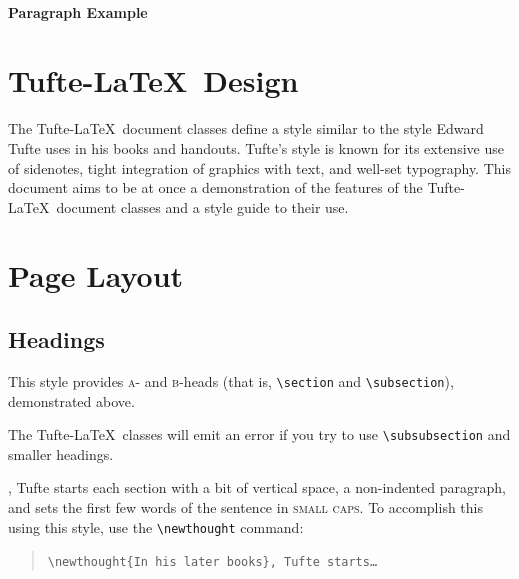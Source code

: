 \documentclass[a4paper]{tufte-handout}
\newcommand{\doccmd}[1]{\texttt{\textbackslash#1}}
\newenvironment{docspec}{\begin{quote}\noindent}{\end{quote}}
\newcommand{\TL}{Tufte-\LaTeX\xspace}
\begin{document}
\paragraph{Paragraph Example}

\section{\TL~Design}
The Tufte-\LaTeX\ document classes define a style similar to the
style Edward Tufte uses in his books and handouts. Tufte's style is known
for its extensive use of sidenotes, tight integration of graphics with
text, and well-set typography. This document aims to be at once a
demonstration of the features of the Tufte-\LaTeX\ document classes
and a style guide to their use.

\section{Page Layout}\label{sec:page-layout}
\subsection{Headings}\label{sec:headings}
This style provides \textsc{a}- and \textsc{b}-heads (that is,
\Verb|\section| and \Verb|\subsection|), demonstrated above.

The Tufte-\LaTeX\ classes will emit an error if you try to use
\linebreak\Verb|\subsubsection| and smaller headings.

,\cite{Tufte2006} Tufte
starts each section with a bit of vertical space, a non-indented paragraph,
and sets the first few words of the sentence in \textsc{small caps}. To
accomplish this using this style, use the \Verb|\newthought| command:  
\begin{docspec}
  \doccmd{newthought\{In his later books\}, Tufte starts\ldots}
\end{docspec}
\end{document}
